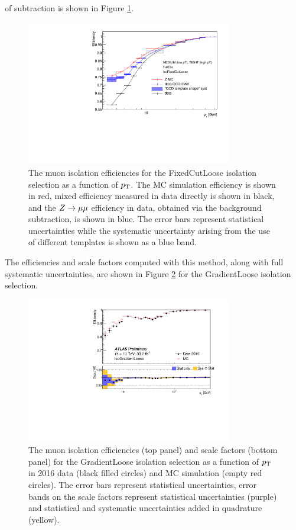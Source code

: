 of subtraction is shown in Figure \ref{fig:muon:sub}.
\begin{figure}[h!]
  \centering
  \includegraphics[width=0.8\textwidth]{figures/muons/subtraction}
  \caption[Muon isolation efficiencies]{The muon isolation efficiencies
  for the FixedCutLoose isolation selection as a function of $p_{\text{T}}$.
  The MC simulation efficiency is shown in red, mixed efficiency measured
  in data directly is shown in black, and the $Z \rightarrow \mu\mu$ efficiency
  in data, obtained via the background subtraction, is shown in blue.
  The error bars represent statistical uncertainties while the systematic uncertainty arising from
  the use of different templates is shown as a blue band.}
  \label{fig:muon:sub}
\end{figure}
The efficiencies and scale factors computed with this method, along with
full systematic uncertainties, are shown in Figure \ref{fig:muon:sf} for
the GradientLoose isolation selection.
\begin{figure}[h!]
  \centering
  \includegraphics[width=0.8\textwidth]{figures/muons/sf}
  \caption[Muon isolation scale factors]{The muon isolation efficiencies
  (top panel) and scale factors (bottom panel) for the GradientLoose
  isolation selection as a function of $p_{\text{T}}$ in 2016 data (black filled
  circles) and MC simulation (empty red circles). The error bars represent
  statistical uncertainties, error bands on the scale factors represent
  statistical uncertainties (purple) and statistical and systematic
  uncertainties added in quadrature (yellow).
  }
  \label{fig:muon:sf}
\end{figure}
